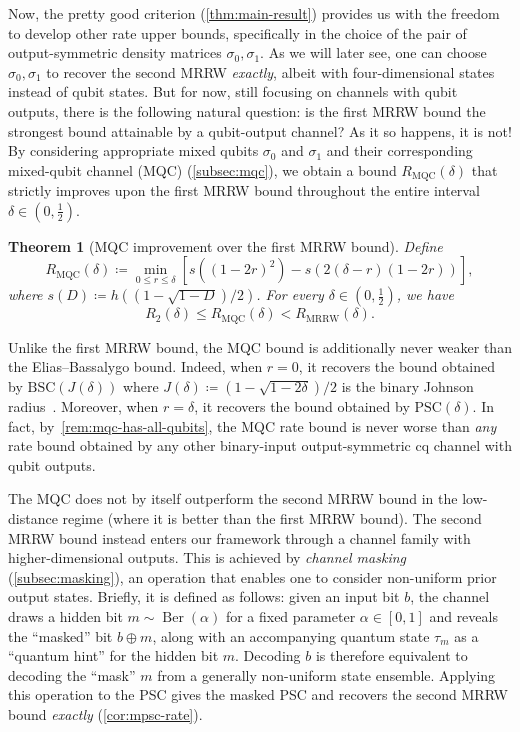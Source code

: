 \documentclass[11pt]{article}
\renewcommand{\leq}{\leqslant}
\newtheorem{theorem}{Theorem}
\theoremstyle{remark}
\newcommand{\Ber}{\operatorname{Ber}}
\newcommand{\MRRW}{R_{\mathrm{MRRW}}}
\newcommand{\BSC}{\mathrm{BSC}}
\newcommand{\PSC}{\mathrm{PSC}}
\newcommand{\MQC}{\mathrm{MQC}}
\begin{document}
Now, the pretty good criterion (\cref{thm:main-result}) provides us with the freedom to develop other rate upper bounds, specifically in the choice of the pair of output-symmetric density matrices $\sigma_0,\sigma_1$. As we will later see, one can choose $\sigma_0,\sigma_1$ to recover the second MRRW \emph{exactly}, albeit with four-dimensional states instead of qubit states. But for now, still focusing on channels with qubit outputs, there is the following natural question: is the first MRRW bound the strongest bound attainable by a qubit-output channel? As it so happens, it is not! By considering appropriate mixed qubits $\sigma_0$ and $\sigma_1$ and their corresponding mixed-qubit channel (MQC) (\cref{subsec:mqc}), we obtain a bound $R_{\MQC}(\delta)$ that strictly improves upon the first MRRW bound throughout the entire interval $\delta \in (0,\frac{1}{2})$.

\begin{theorem}[MQC improvement over the first MRRW bound]
\label{thm:first-mrrw-improvement}
Define
\begin{equation*}
R_{\MQC}(\delta)
\coloneqq
\min_{0 \leq r \leq \delta}
\left[s\left((1-2r)^2\right)-s\left(2(\delta-r)(1-2r)\right)\right],
\end{equation*}
where $s(D) \coloneqq h((1-\sqrt{1-D})/2)$. For every $\delta \in (0,\frac{1}{2})$, we have
\begin{equation*}
R_2(\delta) \leq R_{\MQC}(\delta) < \MRRW(\delta).
\end{equation*}
\end{theorem}

Unlike the first MRRW bound, the MQC bound is additionally never weaker than the Elias--Bassalygo bound. Indeed, when $r = 0$, it recovers the bound obtained by $\BSC(J(\delta))$ where $J(\delta) \coloneqq (1-\sqrt{1-2\delta})/2$ is the binary Johnson radius~\cite{Joh62}. Moreover, when $r = \delta$, it recovers the bound obtained by $\PSC(\delta)$. In fact, by~\cref{rem:mqc-has-all-qubits}, the MQC rate bound is never worse than \emph{any} rate bound obtained by any other binary-input output-symmetric cq channel with qubit outputs.

The MQC does not by itself outperform the second MRRW bound in the low-distance regime (where it is better than the first MRRW bound). The second MRRW bound instead enters our framework through a channel family with higher-dimensional outputs. This is achieved by \emph{channel masking} (\cref{subsec:masking}), an operation that enables one to consider non-uniform prior output states. Briefly, it is defined as follows: given an input bit $b$, the channel draws a hidden bit $m \sim \Ber(\alpha)$ for a fixed parameter $\alpha \in [0,1]$ and reveals the ``masked'' bit $b \oplus m$, along with an accompanying quantum state $\tau_m$ as a ``quantum hint'' for the hidden bit $m$. Decoding $b$ is therefore equivalent to decoding the ``mask'' $m$ from a generally non-uniform state ensemble. Applying this operation to the PSC gives the masked PSC and recovers the second MRRW bound \emph{exactly} (\cref{cor:mpsc-rate}).
\end{document}
